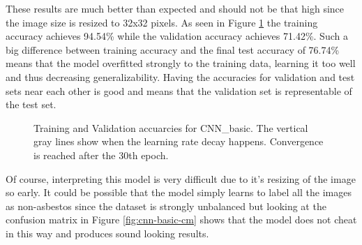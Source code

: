 \quad


These results are much better than expected and should not be that high since the image size is resized to 32x32 pixels. As seen in Figure \ref{fig:cnn-basic} the training accuracy achieves 94.54\% while the validation accuracy achieves 71.42\%. Such a big difference between training accuracy and the final test accuracy of 76.74\% means that the model overfitted strongly to the training data, learning it too well and thus decreasing generalizability. Having the accuracies for validation and test sets near each other is good and means that the validation set is representable of the test set.

\begin{figure}[h]
\centering
{}
\caption{Training and Validation accuarcies for CNN\_basic. The vertical gray lines show when the learning rate decay happens. Convergence is reached after the 30th epoch.}
\label{fig:cnn-basic}
\end{figure}


Of course, interpreting this model is very difficult due to it's resizing of the image so early. It could be possible that the model simply learns to label all the images as non-asbestos since the dataset is strongly unbalanced but looking at the confusion matrix in Figure \ref{fig:cnn-basic-cm} shows that the model does not cheat in this way and produces sound looking results.

